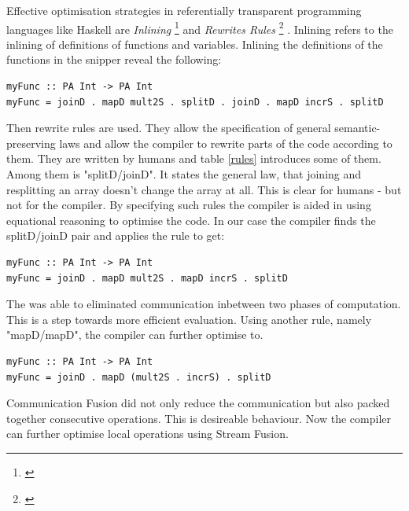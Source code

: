     Effective optimisation strategies in referentially transparent
    programming languages like Haskell are \emph{Inlining}
    \footnote{\cite{Inlining2002}}
    and \emph{Rewrites Rules}
    \footnote{\cite{Simon2001Rewrites}}
    .
    Inlining refers to the inlining of definitions
    of functions and variables. Inlining the definitions
    of the functions in the snipper reveal the following:
    \begin{lstlisting}
myFunc :: PA Int -> PA Int
myFunc = joinD . mapD mult2S . splitD . joinD . mapD incrS . splitD
    \end{lstlisting}
    Then rewrite rules are used. They allow the specification of general semantic-preserving
    laws and allow the compiler to rewrite parts of the code according to them.
    They are written by humans and table \ref{rules} introduces some of them.
    Among them is "splitD/joinD". It states the general law,
    that joining and resplitting an array doesn't change the array at all.
    This is clear for humans - but not for the compiler. By specifying such rules
    the compiler is aided in using equational reasoning to
    optimise the code. In our case the compiler finds the splitD/joinD pair and applies the rule to get:
    \begin{lstlisting}
myFunc :: PA Int -> PA Int
myFunc = joinD . mapD mult2S . mapD incrS . splitD
    \end{lstlisting}
    The was able to eliminated communication inbetween two phases of computation.
    This is a step towards more efficient evaluation.
    Using another rule, namely "mapD/mapD", the compiler can further optimise to.
    \begin{lstlisting}
myFunc :: PA Int -> PA Int
myFunc = joinD . mapD (mult2S . incrS) . splitD
    \end{lstlisting}
    Communication Fusion did not only reduce the communication but also
    packed together consecutive operations. This is desireable behaviour.
    Now the compiler can further optimise local operations using Stream Fusion.
    
    
